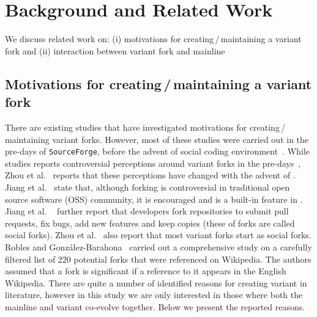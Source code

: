 \section{Background and Related Work}
\label{sec:background}
We discuss related work on: (i) motivations for creating\,/\,maintaining a variant fork and (ii) interaction between variant fork and mainline%

\subsection{Motivations for creating\,/\,maintaining a variant fork}
\label{sec:motivations}
There are existing studies that have investigated motivations for creating\,/\,maintaining variant forks. However, most of these studies were carried out in the pre-\gh days of \texttt{SourceForge}, before the advent of social coding environment~\cite{Linus:2012Perspectives,Gregorio:2012,Viseur:2012Forks,Linus:2013CodeForking,Laurent:2008,Linus:2011ToFork}. While studies reports controversial perceptions around variant forks in the pre-\gh days~\cite{Chua:Forking:2017,Dixion:2009Forks,Ernst:2010,Linus:2011ToFork,Linus:2014Hackers,Raymond:Cathedral:2001}, Zhou et al.~\cite{Zhou:2020} reports that these perceptions have changed with the advent of \gh. Jiang et al.~\cite{Lo:2017} state that, although forking is controversial in traditional open source software (OSS) community, it is encouraged and is a built-in feature in \gh. Jiang et al. ~\cite{Lo:2017} further report that developers fork repositories to submit pull requests, fix bugs, add new features and keep copies (these of forks are called social forks). Zhou et al.~\cite{Zhou:2020} also report that most variant forks start as social forks. 
Robles and Gonz{\'a}lez-Barahona~\cite{Gregorio:2012} carried out a comprehensive study on a carefully filtered list of 220 potential forks that were referenced on Wikipedia. The authors assumed that a fork is significant if a reference to it appears in the English Wikipedia.
There are quite a number of identified reasons for creating variant in literature, however in this study we are only interested in those where both the mainline and variant co-evolve together. Below we present the reported reasons. 

